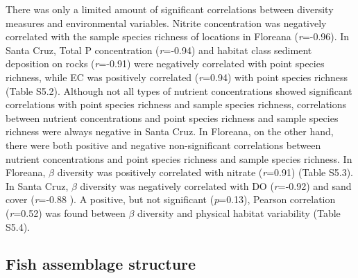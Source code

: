 There was only a limited amount of significant correlations between diversity measures and environmental variables. Nitrite concentration was negatively correlated with the sample species richness of locations in Floreana (\textit{r}=-0.96). In Santa Cruz, Total P concentration (\textit{r}=-0.94) and habitat class sediment deposition on rocks (\textit{r}=-0.91) were negatively correlated with point species richness, while EC was positively correlated (\textit{r}=0.94) with point species richness (Table S5.2). Although not all types of nutrient concentrations showed significant correlations with point species richness and sample species richness, correlations between nutrient concentrations and point species richness and sample species richness were always negative in Santa Cruz. In Floreana, on the other hand, there were both positive and negative non-significant correlations between nutrient concentrations and point species richness and sample species richness. In Floreana, $\beta$ diversity was positively correlated with nitrate (\textit{r}=0.91) (Table S5.3). In Santa Cruz, $\beta$ diversity was negatively correlated with DO (\textit{r}=-0.92) and sand cover (\textit{r}=-0.88 ). A positive, but not significant (\textit{p}=0.13), Pearson correlation (\textit{r}=0.52) was found between $\beta$ diversity and physical habitat variability (Table S5.4). 

\FloatBarrier

\subsection{Fish assemblage structure}
\label{Fishassemblagestructure}

